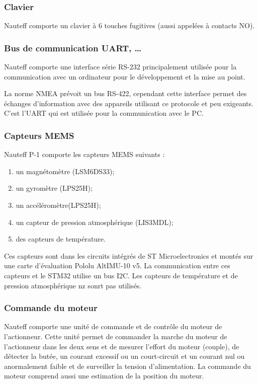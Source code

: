 \documentclass[a4paper,11pt]{report}
\begin{document}
\subsubsection{Clavier}
Nauteff comporte un clavier à 6 touches fugitives (aussi appelées à contacts NO).

\subsubsection{Bus de communication UART, \ldots}
Nauteff comporte une interface série RS-232 principalement utilisée
pour la communication avec un ordinateur pour le développement et
la mise au point.

La norme \gls{NMEA} prévoit un bus RS-422, cependant cette interface
permet des échanges d'information avec des appareils utilisant
ce protocole et peu exigeants.
C'est l'\gls{UART} qui est utilisée pour la communication avec le PC.

\subsubsection{Capteurs MEMS}
Nauteff P-1 comporte les capteurs \gls{MEMS} suivants :
\begin{enumerate}
	\item un magnétomètre (LSM6DS33);
	\item un gyromètre (LPS25H);
	\item un accéléromètre(LPS25H);
	\item un capteur de pression atmosphérique (LIS3MDL);
	\item des capteurs de température.
\end{enumerate}
Ces capteurs sont dans les circuits intégrés de ST Microelectronics et montés
sur une carte d'évaluation Pololu AltIMU-10 v5. La communication entre ces capteurs et le STM32 utilise un bus \gls{I2C}. Les capteurs de température et de pression atmosphérique nz sonrt pas utilisés.

\subsubsection{Commande du moteur}
Nauteff comporte une unité de commande et de contrôle du moteur de l'actionneur.
Cette unité permet de commander la marche du moteur de l'actionneur
dans les deux sens et de mesurer l'effort du moteur (couple),
de détecter la butée, un courant excessif ou un court-circuit et un courant nul
ou anormalement faible et de surveiller la tension d'alimentation.
La commande du moteur comprend aussi une estimation de la position du moteur.
\end{document}
